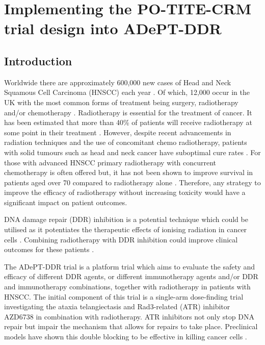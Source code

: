 
\chapter{Implementing the PO-TITE-CRM trial design into ADePT-DDR} %

\label{Chapter2} %


\section{Introduction}

Worldwide there are approximately 600,000 new cases of Head and Neck Squamous Cell Carcinoma (HNSCC) each year \cite{stranskyMutationalLandscapeHead2011}. Of which, 12,000 occur in the UK with the most common forms of treatment being surgery, radiotherapy and/or chemotherapy \cite{cancerreaserchukHeadNeckCancers2017}. Radiotherapy is essential for the treatment of cancer. It has been estimated that more than 40\% of patients will receive radiotherapy at some point in their treatment \cite{roundRadiotherapyDemandActivity2013}. However, despite recent advancements in radiation techniques and the use of concomitant chemo radiotherapy, patients with solid tumours such as head and neck cancer have suboptimal cure rates \cite{cancerreaserchukHeadNeckCancers2017,cognettiHeadNeckCancer2008}. For those with advanced HNSCC primary radiotherapy with concurrent chemotherapy is often offered but, it has not been shown to improve survival in patients aged over 70 compared to radiotherapy alone \cite{pignonChemotherapyAddedLocoregional2000}. Therefore, any strategy to improve the efficacy of radiotherapy without increasing toxicity would have a significant impact on patient outcomes. 

DNA damage repair (DDR) inhibition is a potential technique which could be utilised as it potentiates the therapeutic effects of ionising radiation in cancer cells \cite{oconnorTargetingDNADamage2015}. Combining radiotherapy with DDR inhibition could improve clinical outcomes for these patients \cite{chalmersScienceFocusCombining2016}.  

The ADePT-DDR trial is a platform trial which aims to evaluate the safety and efficacy of different DDR agents, or different immunotherapy agents and/or DDR and immunotherapy combinations, together with radiotherapy in patients with HNSCC. The initial component of this trial is a single-arm dose-finding trial investigating the ataxia telangiectasis and Rad3-related (ATR) inhibitor AZD6738 in combination with radiotherapy. ATR inhibitors not only stop DNA repair but impair the mechanism that allows for repairs to take place. Preclinical models have shown this double blocking to be effective in killing cancer cells \cite{meiAtaxiaTelangiectasiaRad3related2019}. 

